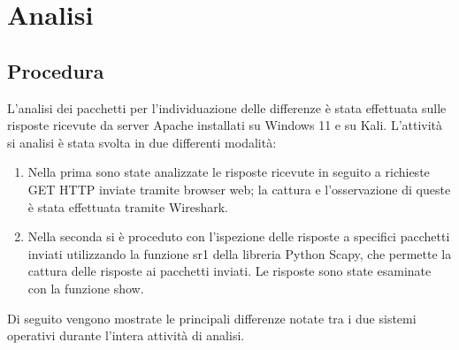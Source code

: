 \chapter{Analisi}

\section{Procedura}
L'analisi dei pacchetti per l'individuazione delle differenze è stata effettuata sulle risposte ricevute da server Apache installati su Windows 11 e su Kali.
L'attività si analisi è stata svolta in due differenti modalità:
\begin{enumerate}
	\item Nella prima sono state analizzate le risposte ricevute in seguito a richieste GET HTTP inviate tramite browser web; la cattura e l'osservazione di queste è stata effettuata tramite Wireshark.
	\item Nella seconda si è proceduto con l'ispezione delle risposte a specifici pacchetti inviati utilizzando la funzione sr1 della libreria Python Scapy, che permette la cattura delle risposte ai pacchetti inviati. Le risposte sono state esaminate con la funzione show.
\end{enumerate}
Di seguito vengono mostrate le principali differenze notate tra i due sistemi operativi durante l'intera attività di analisi.

